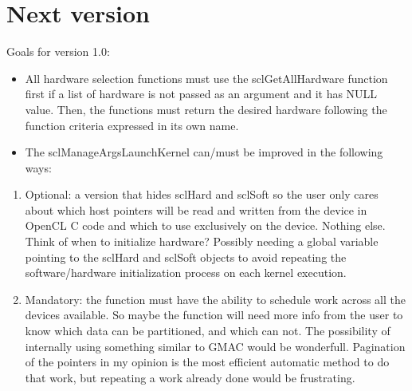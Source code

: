 \documentclass{report}
\begin{document}
\section{Next version}

Goals for version 1.0:

\begin{itemize}
  \item All hardware selection functions must use the sclGetAllHardware function first if a list of hardware is not passed as an argument and it has NULL value. Then, the functions must return the desired hardware following the function criteria expressed in its own name.
  \item The sclManageArgsLaunchKernel can/must be improved in the following ways:
\end{itemize}
	
\begin{enumerate}
\item Optional: a version that hides sclHard and sclSoft so the user only cares about which host pointers will be read and written from the device in OpenCL C code and which to use exclusively on the device. Nothing else. Think of when to initialize hardware? Possibly needing a global variable pointing to the sclHard and sclSoft objects to avoid repeating the software/hardware initialization process on each kernel execution.
\item Mandatory: the function must have the ability to schedule work across all the devices available. So maybe the function will need more info from the user to know which data can be partitioned, and which can not. The possibility of internally using something similar to GMAC would be wonderfull. Pagination of the pointers in my opinion is the most efficient automatic method to do that work, but repeating a work already done would be frustrating.
\end{enumerate}
\end{document}

